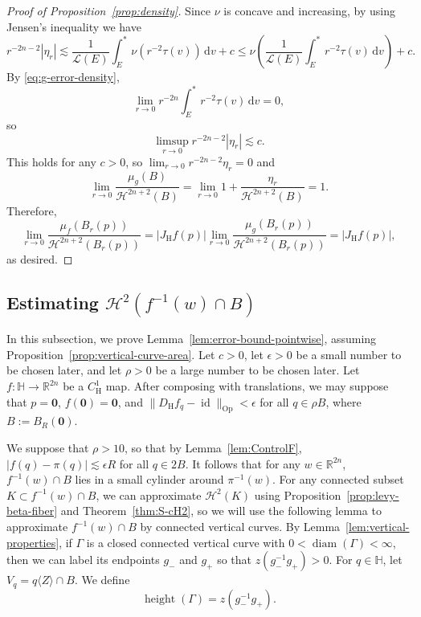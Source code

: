 \documentclass[12pt,reqno]{amsart}
\newcommand{\cH}{\mathcal{H}}
\newcommand{\cL}{\mathcal{L}}
\newcommand{\JfH}{J_\mathrm{H}f}
\newcommand{\DfH}{D_\mathrm{H}f}
\DeclareMathOperator{\height}{height}
\newcommand{\HH}{\mathbb{H}}
\newcommand{\R}{\mathbb{R}}
\newcommand{\ud}[0]{\,\mathrm{d}}
\newcommand{\zero}{\mathbf{0}}
\newcommand{\from}{\colon}
\theoremstyle{remark}
\newcommand{\0}{\mathbf{0}}
\renewcommand{\1}{\mathbf 1}
\DeclareMathOperator{\diam}{diam}
\DeclareMathOperator{\id}{id}
\begin{document}
\begin{proof}[Proof of Proposition~\ref{prop:density}]
  Since $\nu$ is concave and increasing, by using Jensen's inequality we have
  $$r^{-2n-2} |\eta_r| \lesssim \frac{1}{\cL(E)} \int^*_E \nu(r^{-2} \tau(v)) \ud v + c \le \nu\left(\frac{1}{\cL(E)} \int^*_E r^{-2}\tau(v) \ud v \right) + c.$$
  By \eqref{eq:g-error-density},
  $$\lim_{r\to 0} r^{-2n} \int^*_E r^{-2}\tau(v) \ud v = 0,$$
  so
  $$\limsup_{r\to 0} r^{-2n-2} |\eta_r| \lesssim c.$$
  This holds for any $c>0$, so $\lim_{r\to 0} r^{-2n-2} \eta_r = 0$ and
  $$\lim_{r\to 0} \frac{\mu_g(B)}{\cH^{2n+2}(B)} = \lim_{r\to 0} 1 + \frac{\eta_r}{\cH^{2n+2}(B)} = 1.$$
  Therefore,
  $$\lim_{r\to 0} \frac{\mu_f(B_r(p))}{\cH^{2n+2}(B_r(p))} = |\JfH(p)| \lim_{r\to 0} \frac{\mu_g(B_r(p))}{\cH^{2n+2}(B_r(p))}  = |\JfH(p)|,$$
  as desired.
\end{proof}

\subsection{Estimating \texorpdfstring{$\cH^2(f^{-1}(w)\cap B)$}{H\^{}2(f\^{}-1(w))}}\label{sec:proof-error-bound-pointwise}
In this subsection, we prove Lemma~\ref{lem:error-bound-pointwise}, assuming Proposition~\ref{prop:vertical-curve-area}.
Let $c>0$, let $\epsilon>0$ be a small number to be chosen later, and let $\rho>0$ be a large number to be chosen later. Let $f \from \HH\to \R^{2n}$ be a $C^1_{\mathrm{H}}$ map. After composing with translations, we may suppose that $p=\zero$, $f(\zero) = \zero$, and $\|\DfH_q - \id\|_{\mathrm{Op}} < \epsilon$ for all $q\in \rho B$, where $B:=B_R(\zero)$.  

We suppose that $\rho > 10$, so that by Lemma~\ref{lem:ControlF}, $|f(q) - \pi(q)| \lesssim \epsilon R$ for all $q\in 2B$. It follows that for any $w\in \R^{2n}$, $f^{-1}(w)\cap B$ lies in a small cylinder around $\pi^{-1}(w)$. For any connected subset $K\subset f^{-1}(w)\cap B$, we can approximate $\cH^2(K)$ using Proposition~\ref{prop:levy-beta-fiber} and Theorem~\ref{thm:S-cH2}, so we will use the following lemma to approximate $f^{-1}(w)\cap B$ by connected vertical curves. By Lemma~\ref{lem:vertical-properties}, if $\Gamma$ is a closed connected vertical curve with $0<\diam(\Gamma)<\infty$, then we can label its endpoints $g_-$ and $g_+$ so that $z(g_-^{-1}g_+)>0$. For $q\in \HH$, let $V_q = q \langle Z\rangle \cap B$. We define
$$\height(\Gamma) = z(g_-^{-1}g_+).$$
\end{document}
